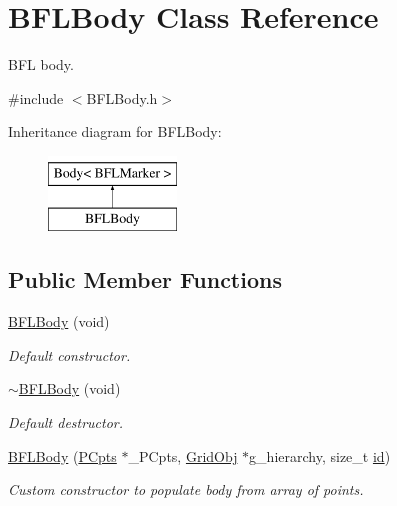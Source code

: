 \hypertarget{class_b_f_l_body}{}\section{B\+F\+L\+Body Class Reference}
\label{class_b_f_l_body}


B\+FL body.  




{\ttfamily \#include $<$B\+F\+L\+Body.\+h$>$}

Inheritance diagram for B\+F\+L\+Body\+:\begin{figure}[H]
\begin{center}
\leavevmode
\includegraphics[height=2.000000cm]{class_b_f_l_body}
\end{center}
\end{figure}
\subsection*{Public Member Functions}
\begin{DoxyCompactItemize}
\item 
\hyperlink{class_b_f_l_body_ab7b3b9f55b59b977401bcf8dead8cfce}{B\+F\+L\+Body} (void)
\begin{DoxyCompactList}\small\item\em Default constructor. \end{DoxyCompactList}\item 
\hyperlink{class_b_f_l_body_ad6d343eed8481d8b652261642e184c43}{$\sim$\+B\+F\+L\+Body} (void)
\begin{DoxyCompactList}\small\item\em Default destructor. \end{DoxyCompactList}\item 
\hyperlink{class_b_f_l_body_a5753a5dd70064fc3fc2d68eed4590ef8}{B\+F\+L\+Body} (\hyperlink{class_p_cpts}{P\+Cpts} $\ast$\+\_\+\+P\+Cpts, \hyperlink{class_grid_obj}{Grid\+Obj} $\ast$g\+\_\+hierarchy, size\+\_\+t \hyperlink{class_body_a9d5166d7419f303190b6c6543e67e815}{id})
\begin{DoxyCompactList}\small\item\em Custom constructor to populate body from array of points. \end{DoxyCompactList}\end{DoxyCompactItemize}
